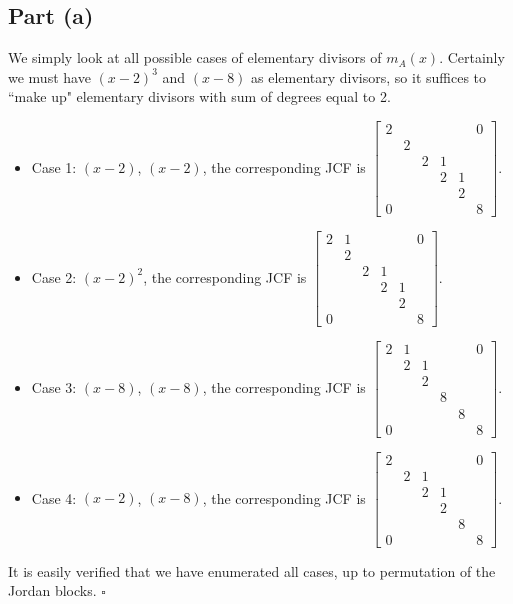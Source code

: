 \documentclass[12pt]{article}
\begin{document}
\subsection*{Part (a)}
We simply look at all possible cases of elementary divisors of $m_A(x)$.
Certainly we must have $(x-2)^3$ and $(x-8)$ as elementary divisors,
so it suffices to ``make up" elementary divisors with sum of degrees equal to 2.
\begin{itemize}
    \item Case 1:
        $(x-2)$, $(x-2)$, the corresponding JCF is $
        \begin{bmatrix} 
            2& & & & &0\\
             &2& & & & \\
             & &2&1& & \\
             & & &2&1& \\
             & & & &2& \\
            0& & & & &8
        \end{bmatrix}$. 
    \item Case 2:
        $(x-2)^2$, the corresponding JCF is $
        \begin{bmatrix} 
            2&1& & & &0\\
             &2& & & & \\
             & &2&1& & \\
             & & &2&1& \\
             & & & &2& \\
            0& & & & &8
        \end{bmatrix}$. 
    \item Case 3:
        $(x-8)$, $(x-8)$, the corresponding JCF is $
        \begin{bmatrix} 
            2&1& & & &0\\
             &2&1& & & \\
             & &2& & & \\
             & & &8& & \\
             & & & &8& \\
            0& & & & &8
        \end{bmatrix}$. 
    \item Case 4:
        $(x-2)$, $(x-8)$, the corresponding JCF is $
        \begin{bmatrix} 
            2& & & & &0\\
             &2&1& & & \\
             & &2&1& & \\
             & & &2& & \\
             & & & &8& \\
            0& & & & &8
        \end{bmatrix}$. 
\end{itemize}
It is easily verified that we have enumerated all cases, up to
permutation of the Jordan blocks.
\hfill$\square$
\end{document}

